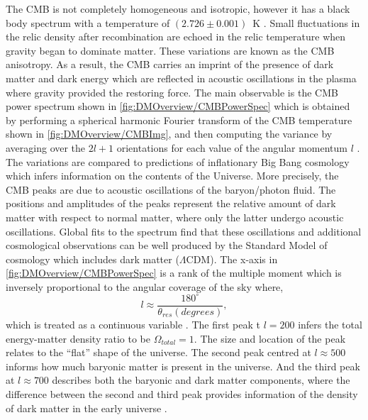 The CMB is not completely homogeneous and isotropic, however it has a black body spectrum with a temperature of $(2.726\pm0.001)$~K \cite{Fixsen_2009}. Small fluctuations in the relic density after recombination are echoed in the relic temperature when gravity began to dominate matter. These variations are known as the CMB anisotropy. As a result, the CMB carries an imprint of the presence of dark matter and dark energy which are reflected in acoustic oscillations in the plasma where gravity provided the restoring force. The main observable is the CMB power spectrum shown in \autoref{fig:DMOverview/CMBPowerSpec} which is obtained by performing a spherical harmonic Fourier transform of the CMB temperature shown in \autoref{fig:DMOverview/CMBImg}, and then computing the variance by averaging over the $2l+1$ orientations for each value of the angular momentum $l$ \cite{Cirelli:2024ssz}. The variations are compared to predictions of inflationary Big Bang cosmology which infers information on the contents of the Universe. More precisely, the CMB peaks are due to acoustic oscillations of the baryon/photon fluid. The positions and amplitudes of the peaks represent the relative amount of dark matter with respect to normal matter, where only the latter undergo acoustic oscillations. Global fits to the spectrum find that these oscillations and additional cosmological observations can be well produced by the Standard Model of cosmology which includes dark matter ($\Lambda \text{CDM}$). The x-axis in \autoref{fig:DMOverview/CMBPowerSpec} is a rank of the multiple moment which is inversely proportional to the angular coverage of the sky where,
\begin{equation}
    l \approx\frac{180^{\circ}}{\theta_{res}(degrees)},
\end{equation}
which is treated as a continuous variable \cite{Young2016}. The first peak t $l=200$ infers the total energy-matter density ratio to be $\Omega_{total}=1$. The size and location of the peak relates to the ``flat'' shape of the universe. The second peak centred at $l\approx500$ informs how much baryonic matter is present in the universe. And the third peak at $l\approx700$ describes both the baryonic and dark matter components, where the difference between the second and third peak provides information of the density of dark matter in the early universe \cite{Young2016}.
